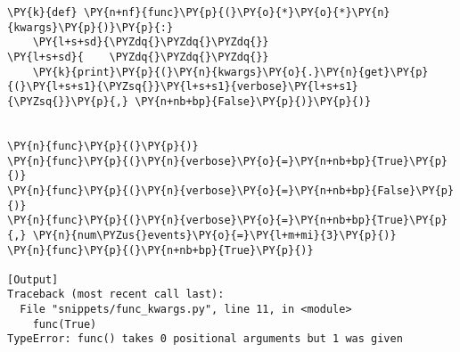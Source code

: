 \begin{Verbatim}[label=\makebox{\url{https://bitbucket.org/lbaldini/programming/src/tip/snippets/func\_kwargs.py}},commandchars=\\\{\}]
\PY{k}{def} \PY{n+nf}{func}\PY{p}{(}\PY{o}{*}\PY{o}{*}\PY{n}{kwargs}\PY{p}{)}\PY{p}{:}
    \PY{l+s+sd}{\PYZdq{}\PYZdq{}\PYZdq{}}
\PY{l+s+sd}{    \PYZdq{}\PYZdq{}\PYZdq{}}
    \PY{k}{print}\PY{p}{(}\PY{n}{kwargs}\PY{o}{.}\PY{n}{get}\PY{p}{(}\PY{l+s+s1}{\PYZsq{}}\PY{l+s+s1}{verbose}\PY{l+s+s1}{\PYZsq{}}\PY{p}{,} \PY{n+nb+bp}{False}\PY{p}{)}\PY{p}{)}


\PY{n}{func}\PY{p}{(}\PY{p}{)}
\PY{n}{func}\PY{p}{(}\PY{n}{verbose}\PY{o}{=}\PY{n+nb+bp}{True}\PY{p}{)}
\PY{n}{func}\PY{p}{(}\PY{n}{verbose}\PY{o}{=}\PY{n+nb+bp}{False}\PY{p}{)}
\PY{n}{func}\PY{p}{(}\PY{n}{verbose}\PY{o}{=}\PY{n+nb+bp}{True}\PY{p}{,} \PY{n}{num\PYZus{}events}\PY{o}{=}\PY{l+m+mi}{3}\PY{p}{)}
\PY{n}{func}\PY{p}{(}\PY{n+nb+bp}{True}\PY{p}{)}

[Output]
Traceback (most recent call last):
  File "snippets/func_kwargs.py", line 11, in <module>
    func(True)
TypeError: func() takes 0 positional arguments but 1 was given
\end{Verbatim}
